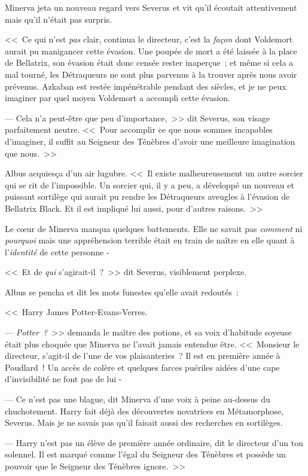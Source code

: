 Minerva jeta un nouveau regard vers Severus et vit qu'il écoutait attentivement mais qu'il n'était pas surpris.

<<~Ce qui n'est \emph{pas} clair, continua le directeur, c'est la \emph{façon} dont Voldemort aurait pu manigancer cette évasion. Une poupée de mort a été laissée à la place de Bellatrix, son évasion était donc censée rester inaperçue~; et même si cela a mal tourné, les Détraqueurs ne sont plus parvenus à la trouver après nous avoir prévenus. Azkaban est restée impénétrable pendant des siècles, et je ne peux imaginer par quel moyen Voldemort a accompli cette évasion.

--- Cela n'a peut-être que peu d'importance,~>> dit Severus, son visage parfaitement neutre. <<~Pour accomplir ce que nous sommes incapables d'imaginer, il suffit au Seigneur des Ténèbres d'avoir une meilleure imagination que nous.~>>

Albus acquiesça d'un air lugubre. <<~Il existe malheureusement un autre sorcier qui se rit de l'impossible. Un sorcier qui, il y a peu, a développé un nouveau et puissant sortilège qui aurait pu rendre les Détraqueurs aveugles à l'évasion de Bellatrix Black. Et il est impliqué lui aussi, pour d'autres raisons.~>>

Le cœur de Minerva manqua quelques battements. Elle ne savait pas \emph{comment} ni \emph{pourquoi} mais une appréhension terrible était en train de naître en elle quant à l'\emph{identité} de cette personne -

<<~Et de \emph{qui} s'agirait-il~?~>> dit Severus, visiblement perplexe.

Albus se pencha et dit les mots funestes qu'elle avait redoutés~:

<<~Harry James Potter-Evans-Verres.

--- \emph{Potter~?}~>> demanda le maître des potions, et sa voix d'habitude soyeuse était plus choquée que Minerva ne l'avait jamais entendue être. <<~Monsieur le directeur, s'agit-il de l'une de vos plaisanteries~? Il est en première année à Poudlard~! Un accès de colère et quelques farces puériles aidées d'une cape d'invisibilité ne font pas de lui -

--- Ce n'est pas une blague, dit Minerva d'une voix à peine au-dessus du chuchotement. Harry fait déjà des découvertes novatrices en Métamorphose, Severus. Mais je ne savais pas qu'il faisait aussi des recherches en sortilèges.

--- Harry n'est pas un élève de première année ordinaire, dit le directeur d'un ton solennel. Il est marqué comme l'égal du Seigneur des Ténèbres et possède un pouvoir que le Seigneur des Ténèbres ignore.~>>

